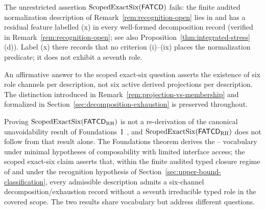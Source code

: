 The unrestricted assertion \(\operatorname{ScopedExactSix}\!\left(\mathsf{FATCD}{}\right)\) fails: the finite
audited normalization description of Remark~\ref{rem:recognition-open} lies
in \FATCD{} and has a residual feature labelled (x) in every well-formed decomposition
record (verified in Remark~\ref{rem:recognition-open}; see also
Proposition~\ref{thm:integrated-stress}(d)). Label (x) there records that no
criterion (i)--(ix) places the normalization predicate; it does not exhibit a
seventh role.

\begin{remark}\label{rem:channel-vs-activation-reminder}
An affirmative answer to the scoped exact-six question asserts the
existence of six role channels per description, not six active derived
projections per description. The distinction introduced in
Remark~\ref{rem:projection-vs-membership} and formalized in
Section~\ref{sec:decomposition-exhaustion} is preserved throughout.
\end{remark}

\begin{remark}\label{rem:fatcd-foundations-relation}
Proving \(\operatorname{ScopedExactSix}\!\left(\mathsf{FATCD}_{\mathrm{RH}}\right)\) is not a re-derivation of the
canonical unavoidability result of Foundations~I~\citep{Tsiokos2026SixBirdsFoundations},
and \(\operatorname{ScopedExactSix}\!\left(\mathsf{FATCD}_{\mathrm{RH}}\right)\) does not follow from that result
alone. The Foundations theorem derives the \Pone{}--\Psix{} vocabulary
under minimal hypotheses of composability with limited interface
access; the scoped exact-six claim asserts that, within the finite
audited typed closure regime of \FATCD{} and under the recognition hypothesis of
Section~\ref{sec:upper-bound-classification}, every admissible description
admits a six-channel decomposition/exhaustion record without a seventh
irreducible typed role in the covered scope. The two results share
vocabulary but address different questions.
\end{remark}
